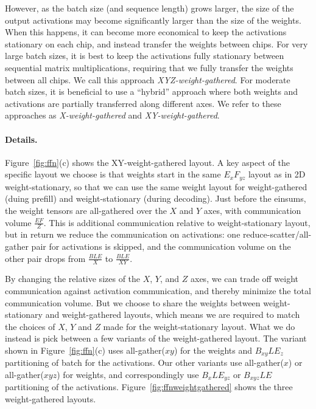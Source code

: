 However, as the batch size (and sequence length) grows larger, the size of the output activations may become significantly larger than the size of the weights. When this happens, it can become more economical to keep the activations stationary on each chip, and instead transfer the weights between chips. For very large batch sizes, it is best to keep the activations fully stationary between sequential matrix multiplications, requiring that we fully transfer the weights between all chips. We call this approach \textit{XYZ-weight-gathered}. For moderate batch sizes, it is beneficial to use a ``hybrid'' approach where both weights and activations are partially transferred along different axes. We refer to these approaches as \textit{X-weight-gathered} and \textit{XY-weight-gathered}. 

\paragraph{Details.} Figure~\ref{fig:ffn}(c) shows the XY-weight-gathered layout. A key aspect of the specific layout we choose is that weights start in the same $E_xF_{yz}$ layout as in 2D weight-stationary, so that we can use the same weight layout for weight-gathered (duing prefill) and weight-stationary (during decoding). Just before the einsums, the weight tensors are all-gathered over the $X$ and $Y$ axes, with communication volume $\frac{EF}{Z}$. This is additional communication relative to weight-stationary layout, but in return we reduce the communication on activations: one reduce-scatter/all-gather pair for activations is skipped, and the communication volume on the other pair drops from $\frac{BLE}{X}$ to $\frac{BLE}{XY}$.

By changing the relative sizes of the $X$, $Y$, and $Z$ axes, we can trade off weight communication against activation communication, and thereby minimize the total communication volume. But we choose to share the weights between weight-stationary and weight-gathered layouts, which means we are required to match the choices of $X$, $Y$ and $Z$ made for the weight-stationary layout. What we do instead is pick between a few variants of the weight-gathered layout. The variant shown in Figure~\ref{fig:ffn}(c) uses all-gather($xy$) for the weights and $B_{xy}LE_z$ partitioning of batch for the activations. Our other variants use all-gather($x$) or all-gather($xyz$) for weights, and correspondingly use $B_xLE_{yz}$ or $B_{xyz}LE$ partitioning of the activations. Figure~\ref{fig:ffnweightgathered} shows the three weight-gathered layouts.

